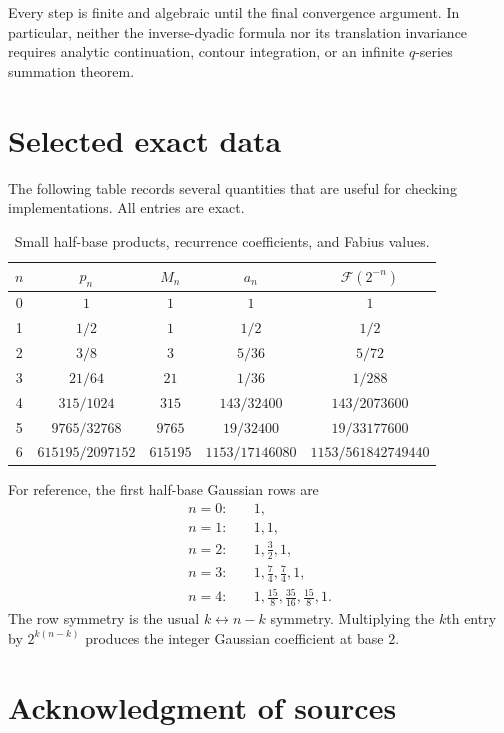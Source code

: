\documentclass[11pt,oneside]{article}
\theoremstyle{definition}
\theoremstyle{remark}
\newcommand{\F}{\mathcal F}
\begin{document}
Every step is finite and algebraic until the final convergence argument.  In
particular, neither the inverse-dyadic formula nor its translation invariance
requires analytic continuation, contour integration, or an infinite
$q$-series summation theorem.

\section{Selected exact data}

The following table records several quantities that are useful for checking
implementations.  All entries are exact.

\begin{table}[H]
\centering
\caption{Small half-base products, recurrence coefficients, and Fabius values.}
\label{tab:exactdata}
\begin{tabular}{@{}ccccc@{}}
\toprule
$n$ & $p_n$ & $M_n$ & $a_n$ & $\F(2^{-n})$\\
\midrule
0 & $1$ & $1$ & $1$ & $1$\\
1 & $1/2$ & $1$ & $1/2$ & $1/2$\\
2 & $3/8$ & $3$ & $5/36$ & $5/72$\\
3 & $21/64$ & $21$ & $1/36$ & $1/288$\\
4 & $315/1024$ & $315$ & $143/32400$ & $143/2073600$\\
5 & $9765/32768$ & $9765$ & $19/32400$ & $19/33177600$\\
6 & $615195/2097152$ & $615195$ & $1153/17146080$ & $1153/561842749440$\\
\bottomrule
\end{tabular}
\end{table}

For reference, the first half-base Gaussian rows are
\begin{align*}
 n=0:&\quad 1,\\
 n=1:&\quad 1,1,\\
 n=2:&\quad 1,\frac32,1,\\
 n=3:&\quad 1,\frac74,\frac74,1,\\
 n=4:&\quad 1,\frac{15}{8},\frac{35}{16},\frac{15}{8},1.
\end{align*}
The row symmetry is the usual $k\leftrightarrow n-k$ symmetry.  Multiplying
the $k$th entry by $2^{k(n-k)}$ produces the integer Gaussian coefficient at
base $2$.

\section*{Acknowledgment of sources}
\end{document}
